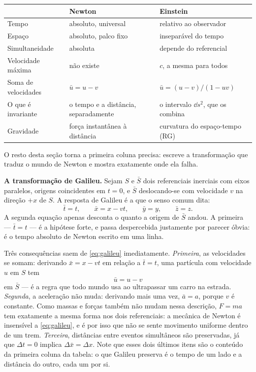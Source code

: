 \documentclass[12pt,a4paper,oneside]{book}
\theoremstyle{rgplain}
\theoremstyle{rgremark}
\begin{document}
\begin{center}
\small
\begin{tabular}{p{3.6cm}p{4.4cm}p{4.4cm}}
\toprule
 & Newton & Einstein \\
\midrule
Tempo & absoluto, universal & relativo ao observador \\
Espaço & absoluto, palco fixo & inseparável do tempo \\
Simultaneidade & absoluta & depende do referencial \\
Velocidade máxima & não existe & $c$, a mesma para todos \\
Soma de velocidades & $\bar u=u-v$ & $\bar u=(u-v)/(1-uv)$ \\
O que é invariante & o tempo e a distância, separadamente & o intervalo
$\dd s^2$, que os combina \\
Gravidade & força instantânea à distância & curvatura do espaço-tempo (RG) \\
\bottomrule
\end{tabular}
\end{center}

O resto desta seção torna a primeira coluna precisa: escreve a transformação
que traduz o mundo de Newton e mostra exatamente onde ela falha.

\textbf{A transformação de Galileu.} Sejam $S$ e $\bar S$ dois referenciais
inerciais com eixos paralelos, origens coincidentes em $t=0$, e $\bar S$
deslocando-se com velocidade $v$ na direção $+x$ de $S$. A resposta de Galileu
é a que o senso comum dita:
\begin{equation}
  \bar t=t,\qquad
  \bar x=x-vt,\qquad
  \bar y=y,\qquad
  \bar z=z .
  \label{eq:galileu}
\end{equation}
A segunda equação apenas desconta o quanto a origem de $\bar S$ andou. A primeira
--- $\bar t=t$ --- é a hipótese forte, e passa despercebida justamente por parecer
óbvia: é o tempo absoluto de Newton escrito em uma linha.

Três consequências saem de \eqref{eq:galileu} imediatamente. \emph{Primeira},
as velocidades se somam: derivando $\bar x=x-vt$ em relação a $\bar t=t$, uma
partícula com velocidade $u$ em $S$ tem
\begin{equation}
  \bar u=u-v
  \label{eq:galileu-velocidades}
\end{equation}
em $\bar S$ --- é a regra que todo mundo usa ao ultrapassar um carro na estrada.
\emph{Segunda}, a aceleração não muda: derivando mais uma vez, $\bar a=a$, porque
$v$ é constante. Como massas e forças também não mudam nessa descrição,
$F=ma$ tem exatamente a mesma forma nos dois referenciais: a mecânica de
Newton é insensível a \eqref{eq:galileu}, e é por isso que não se sente
movimento uniforme dentro de um trem. \emph{Terceira}, distâncias entre
eventos simultâneos são preservadas, já que $\Delta t=0$ implica
$\Delta \bar x=\Delta x$. Note que esses dois últimos itens são o conteúdo da
primeira coluna da tabela: o que Galileu preserva é o tempo de um lado e a
distância do outro, cada um por si.
\end{document}
